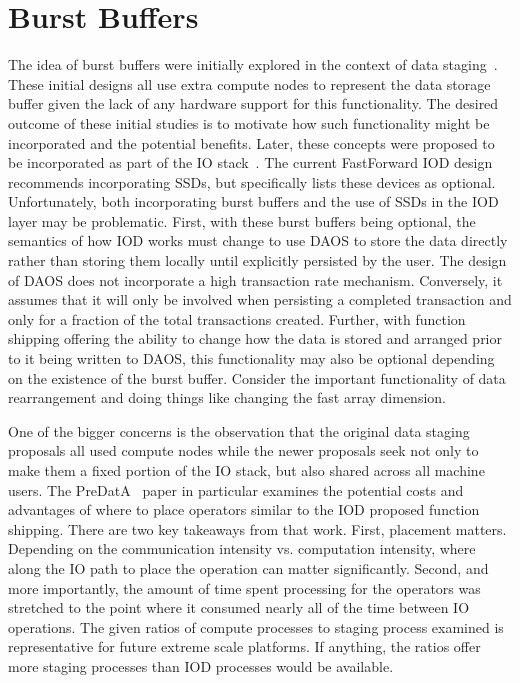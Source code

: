 \documentclass[conference]{sig-alt-gov2}
\begin{document}
\section{Burst Buffers}
\label{sec:burst}

The idea of burst buffers were initially explored in the context of data
staging~\cite{abbasi:2007:datatap,Abbasi:2009:datatap,nisar:2008:staging,zheng:2010:predata}.
These initial designs all use extra compute nodes to represent the data storage
buffer given the lack of any hardware support for this functionality. The
desired outcome of these initial studies is to motivate how such functionality
might be incorporated and the potential benefits.  Later, these concepts were
proposed to be incorporated as part of the IO
stack~\cite{bent:2012:challenges,bent:2012:burst-buffer}.  The current
FastForward IOD design recommends incorporating SSDs, but specifically lists
these devices as optional. Unfortunately, both incorporating burst buffers and
the use of SSDs in the IOD layer may be problematic.  First, with these burst
buffers being optional, the semantics of how IOD works must change to use DAOS
to store the data directly rather than storing them locally until explicitly
persisted by the user. The design of DAOS does not incorporate a high
transaction rate mechanism. Conversely, it assumes that it will only be
involved when persisting a completed transaction and only for a fraction of the
total transactions created. Further, with function shipping offering the
ability to change how the data is stored and arranged prior to it being written
to DAOS, this functionality may also be optional depending on the existence of
the burst buffer. Consider the important functionality of data rearrangement
and doing things like changing the fast array dimension.

One of the bigger concerns is the observation that the original data staging
proposals all used compute nodes while the newer proposals seek not only to
make them a fixed portion of the IO stack, but also shared across all machine
users. The PreDatA~\cite{zheng:2010:predata} paper in particular examines the
potential costs and advantages of where to place operators similar to the IOD
proposed function shipping. There are two key takeaways from that work. First,
placement matters.  Depending on the communication intensity vs. computation
intensity, where along the IO path to place the operation can matter
significantly. Second, and more importantly, the amount of time spent
processing for the operators was stretched to the point where it consumed
nearly all of the time between IO operations. The given ratios of compute
processes to staging process examined is representative for future extreme
scale platforms. If anything, the ratios offer more staging processes than IOD
processes would be available.
\end{document}

